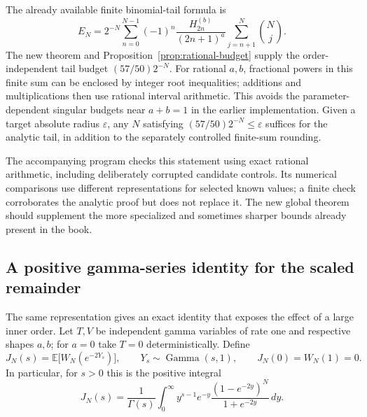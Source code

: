The already available finite binomial-tail formula is
\begin{equation}\label{eq:finite-E}
 E_N=2^{-N}\sum_{n=0}^{N-1}(-1)^n
       \frac{H_{2n}^{(b)}}{(2n+1)^a}
                  \sum_{j=n+1}^N\binom Nj.
\end{equation}
The new theorem and Proposition~\ref{prop:rational-budget} supply the
order-independent tail budget $(57/50)2^{-N}$. For rational $a,b$, fractional powers in this finite
sum can be enclosed by integer root inequalities; additions and
multiplications then use rational interval arithmetic. This avoids
the parameter-dependent singular budgets near $a+b=1$ in the earlier
implementation. Given a target absolute radius $\varepsilon$, any
$N$ satisfying $(57/50)2^{-N}\leq\varepsilon$ suffices for the analytic
tail, in addition to the separately controlled finite-sum rounding.

The accompanying program checks this statement using exact rational
arithmetic, including deliberately corrupted candidate controls.
Its numerical comparisons use different representations for selected
known values; a finite check corroborates the analytic proof but does
not replace it. The new global theorem should supplement the more
specialized and sometimes sharper bounds already present in the book.

\subsection{A positive gamma-series identity for the scaled remainder}

The same representation gives an exact identity that exposes the
effect of a large inner order. Let $T,V$ be independent gamma
variables of rate one and respective shapes $a,b$; for $a=0$
take $T=0$ deterministically. Define
\[
 J_N(s)=\mathbb E\bigl[W_N(e^{-2Y_s})\bigr],
 \qquad Y_s\sim\operatorname{Gamma}(s,1),
 \qquad J_N(0)=W_N(1)=0.
\]
In particular, for $s>0$ this is the positive integral
\[
 J_N(s)=\frac1{\Gamma(s)}
 \int_0^\infty y^{s-1}e^{-y}
             \frac{(1-e^{-2y})^N}{1+e^{-2y}}\,dy.
\]

